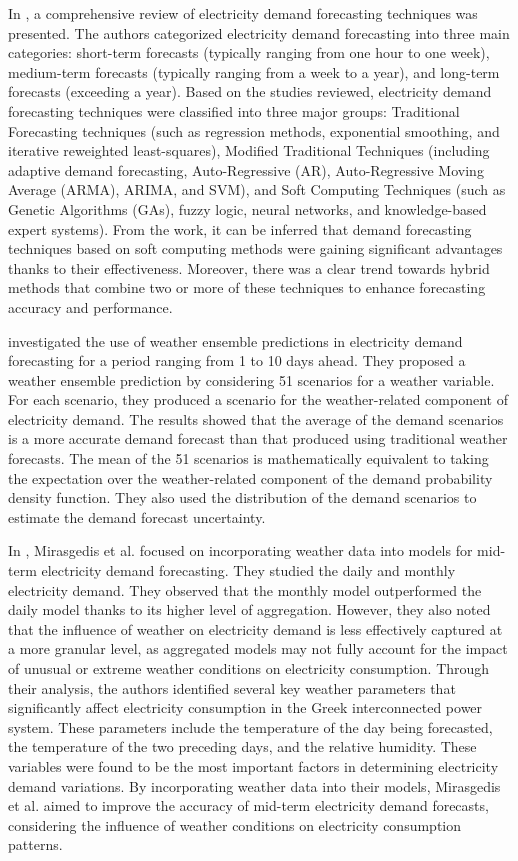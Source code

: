 In \cite{singh2013overview}, a comprehensive review of electricity demand forecasting techniques was presented. 
The authors categorized electricity demand forecasting into three main categories:
short-term forecasts (typically ranging from one hour to one week),
medium-term forecasts (typically ranging from a week to a year),
and long-term forecasts (exceeding a year).
Based on the studies reviewed, electricity demand forecasting techniques were classified into three major groups:
Traditional Forecasting techniques (such as regression methods, exponential smoothing, and iterative reweighted least-squares),
Modified Traditional Techniques (including adaptive demand forecasting, Auto-Regressive (AR), Auto-Regressive Moving Average (ARMA), ARIMA, and SVM),
and Soft Computing Techniques (such as Genetic Algorithms (GAs), fuzzy logic, neural networks, and knowledge-based expert systems).
From the work, it can be inferred that demand forecasting techniques based on soft computing methods were gaining significant advantages thanks to their effectiveness.
Moreover, there was a clear trend towards hybrid methods that combine two or more of these techniques to enhance forecasting accuracy and performance.

\cite{TAYLOR200357} investigated the use of weather ensemble predictions in electricity demand forecasting for a period ranging from 1 to 10 days ahead.
They proposed a weather ensemble prediction by considering 51 scenarios for a weather variable.
For each scenario, they produced a scenario for the weather-related component of electricity demand.
The results showed that the average of the demand scenarios is a more accurate demand forecast than that produced using traditional weather forecasts.
The mean of the 51 scenarios is mathematically equivalent to taking the expectation over the weather-related component of the demand probability density function.
They also used the distribution of the demand scenarios to estimate the demand forecast uncertainty.

In \cite{MIRASGEDIS2006208}, Mirasgedis et al. focused on incorporating weather data into models for mid-term electricity demand forecasting.
They studied the daily and monthly electricity demand.
They observed that the monthly model outperformed the daily model thanks to its higher level of aggregation.
However, they also noted that the influence of weather on electricity demand is less effectively captured at a more granular level, as aggregated models may not fully account for the impact of unusual or extreme weather conditions on electricity consumption.
Through their analysis, the authors identified several key weather parameters that significantly affect electricity consumption in the Greek interconnected power system.
These parameters include the temperature of the day being forecasted, the temperature of the two preceding days, and the relative humidity.
These variables were found to be the most important factors in determining electricity demand variations.
By incorporating weather data into their models, Mirasgedis et al. aimed to improve the accuracy of mid-term electricity demand forecasts, considering the influence of weather conditions on electricity consumption patterns.


